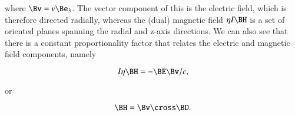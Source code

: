 where \( \Bv = v \Be_3 \).
The vector component of this is the electric field, which is therefore directed radially, whereas the (dual) magnetic field \( \eta I \BH \)
is a set of oriented planes spanning the radial and z-axis directions.
We can also see that there is a constant proportionality factor that relates the electric and magnetic field components, namely

\begin{dmath}\label{eqn:statics_infiniteLineCharge:200}
I \eta \BH = -\BE \Bv/c,
\end{dmath}

or

\begin{dmath}\label{eqn:statics_infiniteLineCharge:220}
\BH = \Bv \cross \BD.
\end{dmath}


